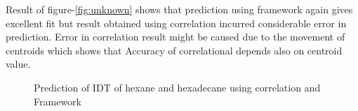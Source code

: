 \documentclass[preprint,12pt]{elsarticle}
\begin{document}
				  		  Result of figure-\ref{fig:unknown} shows that prediction using framework again gives excellent fit but result obtained using correlation incurred considerable error in prediction. Error in correlation result might be caused due to the  movement of centroids which shows that Accuracy of correlational depends also on centroid value. 				  					  		  
				  		   
				  		   \begin{figure}[H]
				  		   	\centering
				  		   	\hspace{0.5cm}
				  		   	\caption{Prediction of IDT of hexane and hexadecane using correlation and Framework}
				  		   	\label{fig:3fuel}
				  		   \end{figure}
\end{document}
